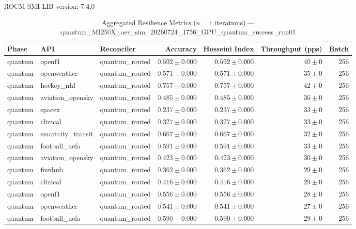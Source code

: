 ROCM-SMI-LIB version: 7.4.0

\begin{table}[htbp]
\caption{Aggregated Resilience Metrics ($n=1$ iterations) --- quantum_MI250X_aer_sim_20260724_1756_GPU_quantum_success_run01}
\begin{tabular}{l l l r r r r}
\hline
Phase & API & Reconciler & Accuracy & Hosseini Index & Throughput (pps) & Batch \\
\hline
quantum & openf1 & quantum\_routed & $0.592\pm0.000$ & $0.592\pm0.000$ & $40\pm0$ & 256 \\
quantum & openweather & quantum\_routed & $0.571\pm0.000$ & $0.571\pm0.000$ & $35\pm0$ & 256 \\
quantum & hockey\_nhl & quantum\_routed & $0.757\pm0.000$ & $0.757\pm0.000$ & $42\pm0$ & 256 \\
quantum & aviation\_opensky & quantum\_routed & $0.485\pm0.000$ & $0.485\pm0.000$ & $36\pm0$ & 256 \\
quantum & spacex & quantum\_routed & $0.237\pm0.000$ & $0.237\pm0.000$ & $33\pm0$ & 256 \\
quantum & clinical & quantum\_routed & $0.327\pm0.000$ & $0.327\pm0.000$ & $33\pm0$ & 256 \\
quantum & smartcity\_transit & quantum\_routed & $0.667\pm0.000$ & $0.667\pm0.000$ & $32\pm0$ & 256 \\
quantum & football\_uefa & quantum\_routed & $0.591\pm0.000$ & $0.591\pm0.000$ & $33\pm0$ & 256 \\
quantum & aviation\_opensky & quantum\_routed & $0.423\pm0.000$ & $0.423\pm0.000$ & $30\pm0$ & 256 \\
quantum & finnhub & quantum\_routed & $0.362\pm0.000$ & $0.362\pm0.000$ & $29\pm0$ & 256 \\
quantum & clinical & quantum\_routed & $0.416\pm0.000$ & $0.416\pm0.000$ & $29\pm0$ & 256 \\
quantum & openf1 & quantum\_routed & $0.556\pm0.000$ & $0.556\pm0.000$ & $28\pm0$ & 256 \\
quantum & openweather & quantum\_routed & $0.541\pm0.000$ & $0.541\pm0.000$ & $27\pm0$ & 256 \\
quantum & football\_uefa & quantum\_routed & $0.590\pm0.000$ & $0.590\pm0.000$ & $29\pm0$ & 256 \\

\end{tabular}
\end{table}
